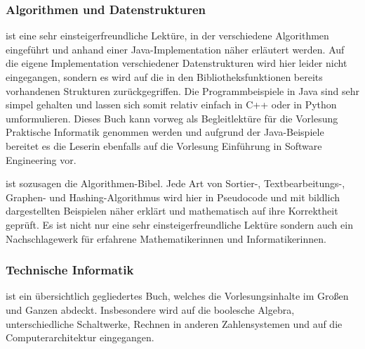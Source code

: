 \subsubsection{Algorithmen und Datenstrukturen}
\begin{description}[style=unboxed]
\item[Sedgewick: Algorithms]{
	ist eine sehr einsteigerfreundliche Lektüre, in der verschiedene Algorithmen eingeführt und anhand einer Java-Implementation näher erläutert werden. Auf die eigene Implementation verschiedener Datenstrukturen wird hier leider nicht eingegangen, sondern es wird auf die in den Bibliotheksfunktionen bereits vorhandenen Strukturen zurückgegriffen. Die Programmbeispiele in Java sind sehr simpel gehalten und lassen sich somit relativ einfach in C++ oder in Python umformulieren. Dieses Buch kann vorweg als Begleitlektüre für die Vorlesung Praktische Informatik genommen werden und aufgrund der Java-Beispiele bereitet es die Leserin ebenfalls auf die Vorlesung Einführung in Software Engineering vor.} 

\item[Cormen: Algorithms]{
	ist sozusagen die Algorithmen-Bibel. Jede Art von Sortier-, Textbearbeitungs-, Graphen- und Hashing-Algorithmus wird hier in Pseudocode und mit bildlich dargestellten Beispielen näher erklärt und mathematisch auf ihre Korrektheit geprüft. Es ist nicht nur eine sehr einsteigerfreundliche Lektüre sondern auch ein Nachschlagewerk für erfahrene Mathematikerinnen und Informatikerinnen.}
\end{description}

\subsubsection{Technische Informatik}
\begin{description}[style=unboxed]
\item[Clements: The Principles of Computer Hardware]{
	ist ein übersichtlich gegliedertes Buch, welches die Vorlesungsinhalte im Großen und Ganzen abdeckt. Insbesondere wird auf die boolesche Algebra, unterschiedliche Schaltwerke, Rechnen in anderen Zahlensystemen und auf die Computerarchitektur eingegangen.}
\end{description}

